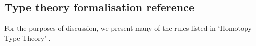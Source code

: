 \documentclass[UKenglish, 11pt, a4paper, parskip=half]{scrbook}
\begin{document}
\begin{appendices}
    \appendixpage
    \noappendicestocpagenum
    \addappheadtotoc

    \chapter{Type theory formalisation reference}
    \label{ch:formalisation_reference}

    For the purposes of discussion, we present many of the rules listed in `Homotopy Type Theory' \cite{hottbook}.

    
\end{appendices}

\backmatter

\printbibliography
\end{document}
